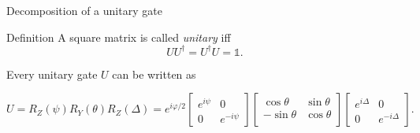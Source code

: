 \begin{frame}{Decomposition of a unitary gate}
\begin{block}{Definition}
A square matrix is called \emph{unitary} iff 
\begin{equation*}
U U^\dagger = U^\dagger U = \mathbb{1}.
\end{equation*} 
\end{block}
\begin{block}{Every unitary gate $U$ can be written as}
\centering

$$U = R_Z(\psi) R_Y (\theta) R_Z(\Delta)
=e^{i\varphi /2}{\begin{bmatrix}e^{i\psi }&0\\0&e^{-i\psi 
}\end{bmatrix}}{\begin{bmatrix}\cos \theta &\sin \theta \\-\sin \theta &\cos 
\theta \\\end{bmatrix}}{\begin{bmatrix}e^{i\Delta }&0\\0&e^{-i\Delta 
}\end{bmatrix}}.$$
\end{block}
\end{frame}

